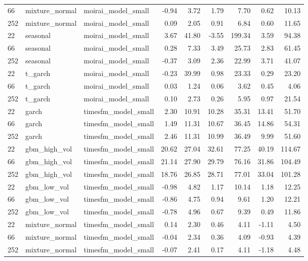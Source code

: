 {\begin{tabular}{lllrrrrrr}
66 & mixture\_normal & moirai\_model\_small & -0.94 & 3.72 & 1.79 & 7.70 & 0.62 & 10.13 \\
252 & mixture\_normal & moirai\_model\_small & 0.09 & 2.05 & 0.91 & 6.84 & 0.60 & 11.65 \\
\midrule
22 & seasonal & moirai\_model\_small & 3.67 & 41.80 & -3.55 & 199.34 & 3.59 & 94.38 \\
66 & seasonal & moirai\_model\_small & 0.28 & 7.33 & 3.49 & 25.73 & 2.83 & 61.45 \\
252 & seasonal & moirai\_model\_small & -0.37 & 3.09 & 2.36 & 22.99 & 3.71 & 41.07 \\
\midrule
22 & t\_garch & moirai\_model\_small & -0.23 & 39.99 & 0.98 & 23.33 & 0.29 & 23.20 \\
66 & t\_garch & moirai\_model\_small & 0.03 & 1.24 & 0.06 & 3.62 & 0.45 & 4.06 \\
252 & t\_garch & moirai\_model\_small & 0.10 & 2.73 & 0.26 & 5.95 & 0.97 & 21.54 \\
\midrule
22 & garch & timesfm\_model\_small & 2.30 & 10.91 & 10.28 & 35.31 & 13.41 & 51.70 \\
66 & garch & timesfm\_model\_small & 1.49 & 11.31 & 10.67 & 36.45 & 14.86 & 54.31 \\
252 & garch & timesfm\_model\_small & 2.46 & 11.31 & 10.99 & 36.49 & 9.99 & 51.60 \\
\midrule
22 & gbm\_high\_vol & timesfm\_model\_small & 20.62 & 27.04 & 32.61 & 77.25 & 40.19 & 114.67 \\
66 & gbm\_high\_vol & timesfm\_model\_small & 21.14 & 27.90 & 29.79 & 76.16 & 31.86 & 104.49 \\
252 & gbm\_high\_vol & timesfm\_model\_small & 18.76 & 26.85 & 28.71 & 77.01 & 33.04 & 101.28 \\
\midrule
22 & gbm\_low\_vol & timesfm\_model\_small & -0.98 & 4.82 & 1.17 & 10.14 & 1.18 & 12.25 \\
66 & gbm\_low\_vol & timesfm\_model\_small & -0.86 & 4.75 & 0.94 & 9.61 & 1.20 & 12.21 \\
252 & gbm\_low\_vol & timesfm\_model\_small & -0.78 & 4.96 & 0.67 & 9.39 & 0.49 & 11.86 \\
\midrule
22 & mixture\_normal & timesfm\_model\_small & 0.14 & 2.30 & 0.46 & 4.11 & -1.11 & 4.50 \\
66 & mixture\_normal & timesfm\_model\_small & -0.04 & 2.34 & 0.36 & 4.09 & -0.93 & 4.39 \\
252 & mixture\_normal & timesfm\_model\_small & -0.07 & 2.41 & 0.17 & 4.11 & -1.18 & 4.48 \\

\end{tabular}}
